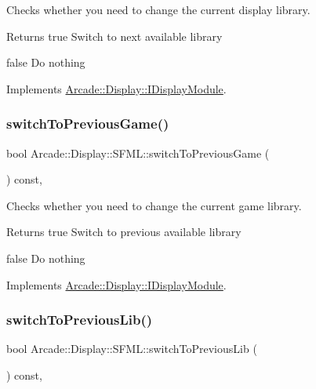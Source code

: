 Checks whether you need to change the current display library. 

\begin{DoxyReturn}{Returns}
true Switch to next available library 

false Do nothing 
\end{DoxyReturn}


Implements \mbox{\hyperlink{classArcade_1_1Display_1_1IDisplayModule_a0de47361c9d47bf8fc52070b945f23b7}{Arcade\+::\+Display\+::\+I\+Display\+Module}}.

\mbox{\label{classArcade_1_1Display_1_1SFML_ae5dbff9dd547fb0a09e478e11bf74c11}} 
\subsubsection{\texorpdfstring{switchToPreviousGame()}{switchToPreviousGame()}}
{\footnotesize\ttfamily bool Arcade\+::\+Display\+::\+S\+F\+M\+L\+::switch\+To\+Previous\+Game (\begin{DoxyParamCaption}{ }\end{DoxyParamCaption}) const\hspace{0.3cm}{\ttfamily [final]}, {\ttfamily [virtual]}}



Checks whether you need to change the current game library. 

\begin{DoxyReturn}{Returns}
true Switch to previous available library 

false Do nothing 
\end{DoxyReturn}


Implements \mbox{\hyperlink{classArcade_1_1Display_1_1IDisplayModule_a3bbbfe00907c8f3e4c7ef1aadedcc513}{Arcade\+::\+Display\+::\+I\+Display\+Module}}.

\mbox{\label{classArcade_1_1Display_1_1SFML_ae77df516bddc7ed5a4c0acdcf2443225}} 
\subsubsection{\texorpdfstring{switchToPreviousLib()}{switchToPreviousLib()}}
{\footnotesize\ttfamily bool Arcade\+::\+Display\+::\+S\+F\+M\+L\+::switch\+To\+Previous\+Lib (\begin{DoxyParamCaption}{ }\end{DoxyParamCaption}) const\hspace{0.3cm}{\ttfamily [final]}, {\ttfamily [virtual]}}



